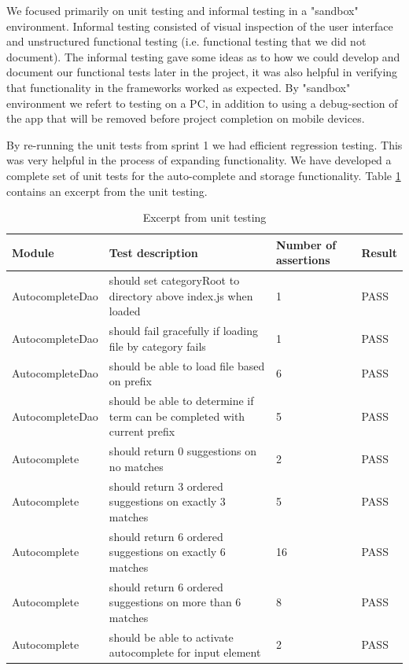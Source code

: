 We focused primarily on unit testing and informal testing in a "sandbox"
environment. Informal testing consisted of visual inspection of the user
interface and unstructured functional testing (i.e. functional testing that we
did not document). The informal testing gave some ideas as to how we could
develop and document our functional tests later in the project, it was also
helpful in verifying that functionality in the frameworks worked as expected.
By "sandbox" environment we refert to testing on a PC, in addition to using a
debug-section of the app that will be removed before project completion on
mobile devices.

By re-running the unit tests from sprint 1 we had efficient regression testing.
This was very helpful in the process of expanding functionality. We have
developed a complete set of unit tests for the auto-complete and storage
functionality. Table \ref{sprint2:unit-testing-table} contains an excerpt from
the unit testing.

\begin{table}[htb]
	\label{sprint2:unit-testing-table}
	\centering
    \begin{tabular}{|l|p{5cm}|l|l|}
		\hline
		Module & Test description & Number of assertions & Result \\
		\hline \hline
		AutocompleteDao & should set categoryRoot to directory above index.js when loaded & 1 & PASS \\ \hline
		AutocompleteDao & should fail gracefully if loading file by category fails & 1 & PASS \\ \hline
		AutocompleteDao & should be able to load file based on prefix & 6 & PASS \\ \hline
		AutocompleteDao & should be able to determine if term can be completed with current prefix & 5 & PASS \\ \hline
		Autocomplete & should return 0 suggestions on no matches & 2 & PASS \\ \hline
		Autocomplete & should return 3 ordered suggestions on exactly 3 matches & 5 & PASS \\ \hline
		Autocomplete & should return 6 ordered suggestions on exactly 6 matches & 16 & PASS \\ \hline
		Autocomplete & should return 6 ordered suggestions on more than 6 matches & 8 & PASS \\ \hline
		Autocomplete & should be able to activate autocomplete for input element & 2 & PASS \\ \hline
    \end{tabular}
  \caption{Excerpt from unit testing}
\end{table}

